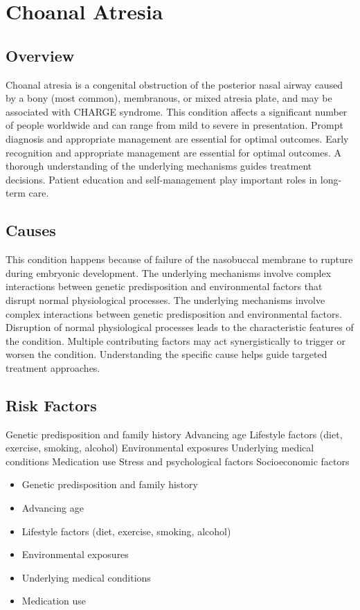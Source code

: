 \chapter{Choanal Atresia}
\label{sec:Choanal Atresia}

\section{Overview}
Choanal atresia is a congenital obstruction of the posterior nasal airway caused by a bony (most common), membranous, or mixed atresia plate, and may be associated with CHARGE syndrome. This condition affects a significant number of people worldwide and can range from mild to severe in presentation. Prompt diagnosis and appropriate management are essential for optimal outcomes. Early recognition and appropriate management are essential for optimal outcomes. A thorough understanding of the underlying mechanisms guides treatment decisions. Patient education and self-management play important roles in long-term care.
\section{Causes}
This condition happens because of failure of the nasobuccal membrane to rupture during embryonic development. The underlying mechanisms involve complex interactions between genetic predisposition and environmental factors that disrupt normal physiological processes. The underlying mechanisms involve complex interactions between genetic predisposition and environmental factors. Disruption of normal physiological processes leads to the characteristic features of the condition. Multiple contributing factors may act synergistically to trigger or worsen the condition. Understanding the specific cause helps guide targeted treatment approaches.
\section{Risk Factors}
Genetic predisposition and family history Advancing age Lifestyle factors (diet, exercise, smoking, alcohol) Environmental exposures Underlying medical conditions Medication use Stress and psychological factors Socioeconomic factors

\begin{itemize}[noitemsep]
  \item Genetic predisposition and family history
  \item Advancing age
  \item Lifestyle factors (diet, exercise, smoking, alcohol)
  \item Environmental exposures
  \item Underlying medical conditions
  \item Medication use
\end{itemize}
